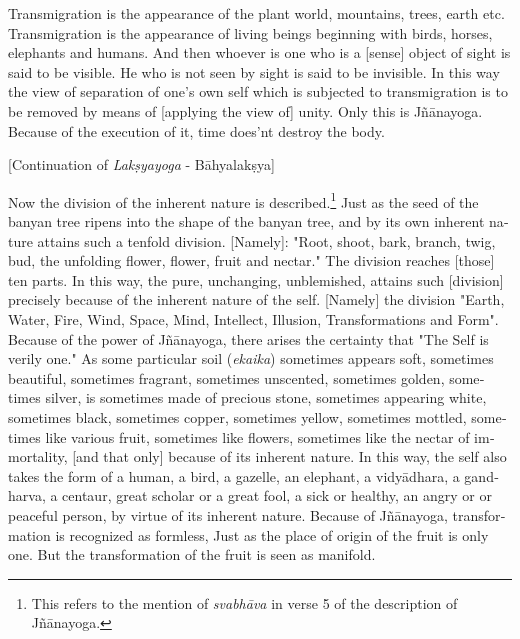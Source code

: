 \begin{otherlanguage}{english}
\begin{tlate}
   Transmigration is the appearance of the plant world, mountains, trees, earth etc. Transmigration is the appearance of living beings beginning with birds, horses, elephants and humans. And then whoever is one who is a [sense] object of sight is said to be visible. He who is not seen by sight is said to be invisible. In this way the view of separation of one's own self which is subjected to transmigration is to be removed by means of [applying the view of] unity. Only this is Jñānayoga. Because of the execution of it, time does'nt destroy the body.
\end{tlate}
      \bigskip
        \centerline{\textrm{\small{[Continuation of \textit{Lakṣyayoga} - Bāhyalakṣya]}}}
          \bigskip
\begin{tlate}    
  Now the division of the inherent nature is described.\footnote{This refers to the mention of \textit{svabhāva} in verse 5 of the description of Jñānayoga.} Just as the seed of the banyan tree ripens into the shape of the banyan tree, and by its own inherent nature attains such a tenfold division. [Namely]: "Root, shoot, bark, branch, twig, bud, the unfolding flower, flower, fruit and nectar." The division reaches [those] ten parts. In this way, the pure, unchanging, unblemished, attains such [division] precisely because of the inherent nature of the self. [Namely] the division "Earth, Water, Fire, Wind, Space, Mind, Intellect, Illusion, Transformations and Form". Because of the power of Jñānayoga, there arises the certainty that "The Self is verily one." As some particular soil (\textit{ekaika}) sometimes appears soft, sometimes beautiful, sometimes fragrant, sometimes unscented, sometimes golden, sometimes silver, is sometimes made of precious stone, sometimes appearing white, sometimes black, sometimes copper, sometimes yellow, sometimes mottled, sometimes like various fruit, sometimes like flowers, sometimes like the nectar of immortality, [and that only] because of its inherent nature. In this way, the self also takes the form of a human, a bird, a gazelle, an elephant, a vidyādhara, a gandharva, a centaur, great scholar or a great fool, a sick or healthy, an angry or or peaceful person, by virtue of its inherent nature. Because of Jñānayoga, transformation is recognized as formless, Just as the place of origin of the fruit is only one. But the transformation of the fruit is seen as manifold.
  

\end{tlate}
\end{otherlanguage}
